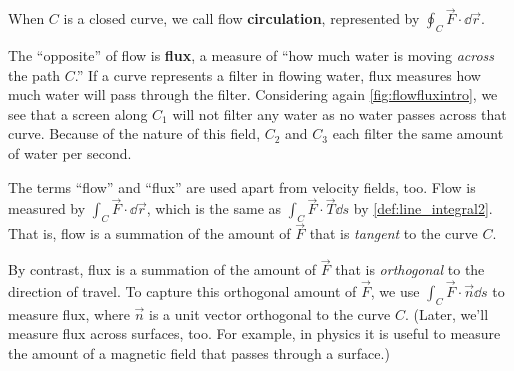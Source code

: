 When $C$ is a closed curve, we call flow \textbf{circulation}, represented by $\oint_C \vec F\cdot\dd\vec r$.


The ``opposite'' of flow is \textbf{flux}, a measure of ``how much water is moving \emph{across} the path $C$.'' If a curve represents a filter in flowing water, flux measures how much water will pass through the filter. Considering again \autoref{fig:flowfluxintro}, we see that a screen along $C_1$ will not filter any water as no water passes across that curve. Because of the nature of this field,  $C_2$ and $C_3$ each filter the same amount of water per second. 

The terms ``flow'' and ``flux'' are used apart from velocity fields, too. Flow is measured by $\int_C \vec F\cdot\dd\vec r$, which is the same as $\int_C \vec F\cdot\vec T\dd s$ by \autoref{def:line_integral2}. That is, flow is a summation of the amount of $\vec F$ that is \emph{tangent} to the curve $C$. %

By contrast, flux is a summation of the amount of $\vec F$ that is \emph{orthogonal} to the direction of travel. To capture this orthogonal amount of $\vec F$, we use $\int_C \vec F \cdot \vec n\dd s$ to measure flux, where $\vec n$ is a unit vector orthogonal to the curve $C$. %
(Later, we'll measure flux across surfaces, too. %
For example, in physics it is useful to measure the amount of a magnetic field that passes through a surface.)



